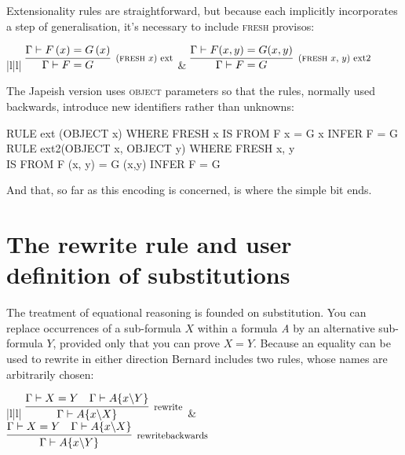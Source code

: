 Extensionality rules are straightforward, but because each implicitly incorporates a step of generalisation, it's necessary to include \textsc{fresh} provisos:

\begin{ruletab}{|l|l|}
\hline
$\infer[\reason{(\textsc{fresh} $x$) ext}]
       {\Gamma  |- F=G}
       {\Gamma  |- F\left( x\right) =G\left( x\right) }$
 & 
$\infer[\reason{(\textsc{fresh} $x$, $y$) ext2}]
       {\Gamma  |- F=G}
       {\Gamma  |- F(x,y)=G(x,y)}$
\\
\hline
\end{ruletab}

The Japeish version uses \textsc{object} parameters so that the rules, normally used backwards, introduce new identifiers rather than unknowns:
\begin{japeish}
RULE ext (OBJECT x) WHERE FRESH x IS FROM  F x = G x INFER F = G\\
RULE ext2(OBJECT x, OBJECT y)  WHERE FRESH x, y\\
\tab IS FROM  F (x, y) = G (x,y)  INFER F = G
\end{japeish}
And that, so far as this encoding is concerned, is where the simple bit ends.

\section{The rewrite rule and user definition of substitutions}

The treatment of equational reasoning is founded on substitution. You can replace occurrences of a sub-formula $X$ within a formula \textit{A} by an alternative sub-formula $Y$, provided only that you can prove $X=Y$. Because an equality can be used to rewrite in either direction Bernard includes two rules, whose names are arbitrarily chosen:

\begin{ruletab}{|l|l|} 
\hline
$\infer[\reason{rewrite}]
	{\Gamma|-A\{x\backslash X\}}
	{\Gamma|-X=Y & \Gamma|-A\{x\backslash Y\}}$
&
$\infer[\reason{rewritebackwards}]
	{\Gamma |-A\{x\backslash Y\}}
	{\Gamma |-X=Y & \Gamma|- A\{x\backslash X\}}$
\\
\hline
\end{ruletab}

